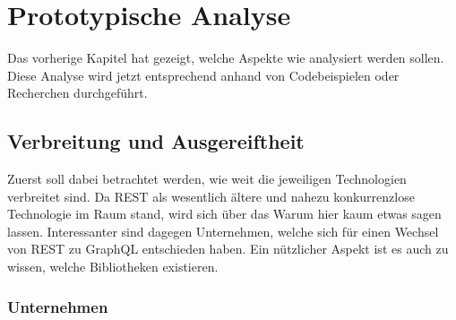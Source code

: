 \chapter{Prototypische Analyse}\label{analyse}

Das vorherige Kapitel hat gezeigt, welche Aspekte wie analysiert werden sollen. Diese Analyse wird jetzt entsprechend anhand von Codebeispielen oder Recherchen durchgeführt.

\section{Verbreitung und Ausgereiftheit}

Zuerst soll dabei betrachtet werden, wie weit die jeweiligen Technologien verbreitet sind. Da \ac{REST} als wesentlich ältere und nahezu konkurrenzlose Technologie im Raum stand, wird sich über das Warum hier kaum etwas sagen lassen. Interessanter sind dagegen Unternehmen, welche sich für einen Wechsel von \ac{REST} zu GraphQL entschieden haben. Ein nützlicher Aspekt ist es auch zu wissen, welche Bibliotheken existieren.

\subsection{Unternehmen}\label{unternehmen}

